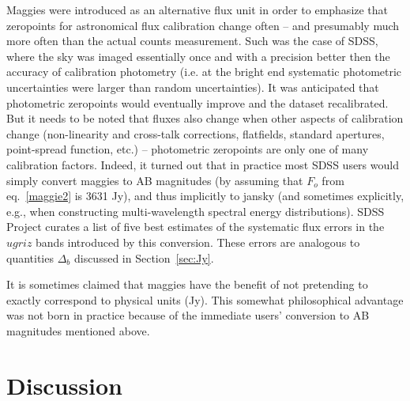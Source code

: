 \documentclass[DM,lsstdraft,toc,usenatbib]{lsstdoc}
\begin{document}
Maggies were introduced as an alternative flux unit in order to emphasize
that zeropoints for astronomical flux calibration change often -- and
presumably much more often than the actual counts measurement. Such
was the case of SDSS, where the sky was imaged essentially once and with
a precision better then the accuracy of calibration photometry (i.e. at
the bright end systematic photometric uncertainties were larger than
random uncertainties). It was anticipated that photometric zeropoints
would eventually improve and the dataset recalibrated.  But it needs to
be noted that fluxes also change when other aspects of calibration change
(non-linearity and cross-talk corrections, flatfields, standard apertures,
point-spread function, etc.) -- photometric zeropoints are only one of
many calibration factors. Indeed, it turned out that in practice most
SDSS users would simply convert maggies to AB magnitudes (by assuming
that $F_o$ from eq.~\ref{maggie2} is 3631 Jy), and thus
implicitly to jansky (and sometimes explicitly, e.g., when constructing
multi-wavelength spectral energy distributions). SDSS Project curates a
list of five best estimates of the systematic flux errors in the $ugriz$
bands introduced by this conversion. These errors are analogous to
quantities $\Delta_b$ discussed in Section~\ref{sec:Jy}.

It is sometimes claimed that maggies have the benefit of not pretending
to exactly correspond to physical units (Jy). This somewhat philosophical
advantage was not born in practice because of the immediate users'
conversion to AB magnitudes mentioned above.


\section{Discussion}
\end{document}
